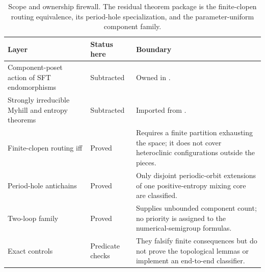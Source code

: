 \begin{table}[t]
\centering
\caption{Scope and ownership firewall.  The residual theorem package is the
finite-clopen routing equivalence, its period-hole specialization, and the
parameter-uniform component family.}
\label{tab:boundary}
\small
\begin{tabularx}{\textwidth}{@{}>{\raggedright\arraybackslash}p{35mm}
  >{\raggedright\arraybackslash}p{25mm}X@{}}
\toprule
Layer & Status here & Boundary \\
\midrule
Component-poset action of SFT endomorphisms & Subtracted & Owned in
\cite[Propositions~3.14--3.15]{ceccheriniCoornaertSalo2026}. \\
Strongly irreducible Myhill and entropy theorems & Subtracted & Imported from
\cite[Theorems~1.1 and~5.1]{ceccheriniCoornaert2012}. \\
Finite-clopen routing iff & Proved & Requires a finite partition exhausting
the space; it does not cover heteroclinic configurations outside the pieces. \\
Period-hole antichains & Proved & Only disjoint periodic-orbit extensions of
one positive-entropy mixing core are classified. \\
Two-loop family & Proved & Supplies unbounded component count; no priority is
assigned to the numerical-semigroup formulas. \\
Exact controls & Predicate checks & They falsify finite consequences but do
not prove the topological lemmas or implement an end-to-end classifier. \\
\bottomrule
\end{tabularx}
\end{table}

